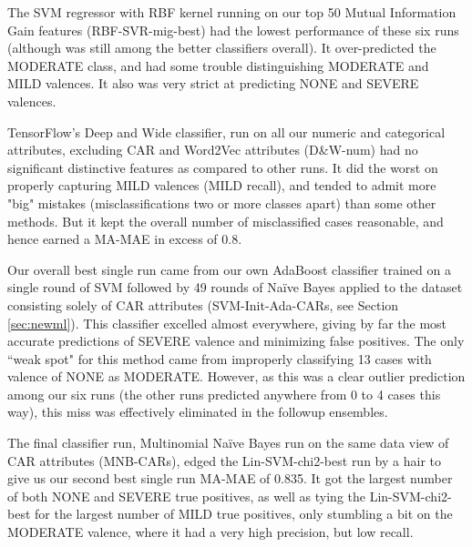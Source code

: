 The SVM regressor with RBF kernel running on our top 50 Mutual Information Gain features
(\textsf{RBF-SVR-mig-best}) had the lowest performance of these six runs
(although was still among the better classifiers overall). It over-predicted
the \textsf{MODERATE} class, and had some trouble distinguishing \textsf{MODERATE}
and \textsf{MILD} valences. It also was very strict at predicting \textsf{NONE}
and \textsf{SEVERE} valences.

TensorFlow's  Deep and Wide  classifier, run on all our
numeric and categorical attributes, excluding CAR and \textsf{Word2Vec}
attributes (\textsf{D\&W-num}) had no significant distinctive features as compared to
other runs. It did the worst on properly capturing \textsf{MILD} valences
(\textsf{MILD} recall), and tended to admit more "big" mistakes
(misclassifications two or more classes apart) than some other methods. 
But it kept the overall number of misclassified cases reasonable,
and hence earned a \textsf{MA-MAE} in excess of 0.8.

Our overall best single run came from our own AdaBoost classifier
trained on a single round of SVM followed by 49 rounds of Na\"{i}ve
Bayes applied to the dataset consisting solely of \textsf{CAR} attributes
(\textsf{SVM-Init-Ada-CARs}, see Section \ref{sec:newml}). 
This classifier excelled almost everywhere, giving by
far the most accurate predictions of \textsf{SEVERE} valence and minimizing
false positives. The only ``weak spot" for this method came from improperly
classifying 13 cases with valence of \textsf{NONE} as \textsf{MODERATE}.
However, as this was a clear outlier prediction among our six runs (the other
runs predicted anywhere from 0 to 4 cases this way), this miss was effectively
eliminated in the followup ensembles.

The final classifier run, Multinomial Na\"{i}ve Bayes run on the same
data view of CAR attributes (\textsf{MNB-CARs}), edged the \textsf{Lin-SVM-chi2-best}
run by a hair to give us our second best single run \textsf{MA-MAE} of 0.835.
It got the largest number of both \textsf{NONE} and \textsf{SEVERE} true
positives, as well as tying the \textsf{Lin-SVM-chi2-best} for the
largest number of \textsf{MILD} true positives, only stumbling
a bit on the \textsf{MODERATE} valence, where it had a very high precision,
but low recall. 







